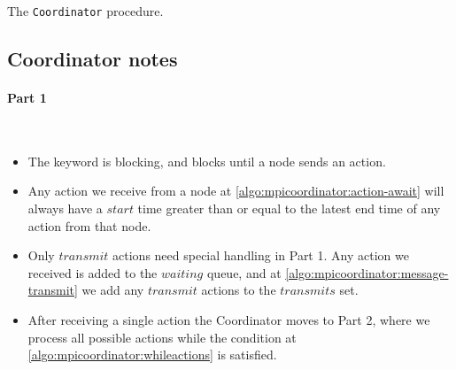 \begin{algorithm}[H]
{{{{                    
                }

            }
        }
    }
    \caption{The \texttt{Coordinator} procedure.}
    \label{algo:mpicoordinator}
\end{algorithm}

\clearpage

\subsection{Coordinator notes}
\paragraph{Part 1} \

\begin{itemize}
    \item The \KwAwait keyword is blocking, and blocks until a node sends an action.
    \item Any action we receive from a node at \autoref{algo:mpicoordinator:action-await} will always have a $start$ time greater than or equal to the latest end time of any action from that node.
    \item Only $transmit$ actions need special handling in Part 1. Any action we received is added to the $waiting$ queue, and at \autoref{algo:mpicoordinator:message-transmit} we add any $transmit$ actions to the $transmits$ set.
    \item After receiving a single action the Coordinator moves to Part 2, where we process all possible actions while the condition at \autoref{algo:mpicoordinator:whileactions} is satisfied.
\end{itemize}

